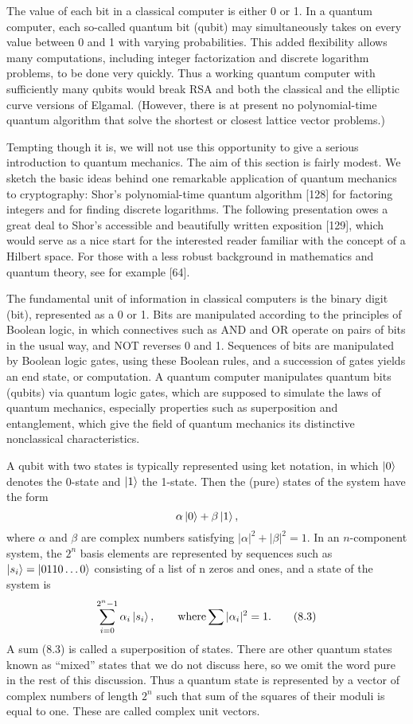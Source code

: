 \documentclass{article}
\begin{document}
The value of each bit in a classical computer is either 0 or 1. In a quantum computer, each so-called quantum bit (qubit) may simultaneously takes on every value between 0 and 1 with varying probabilities. This added flexibility  allows many computations, including integer factorization and discrete logarithm problems, to be done very quickly. Thus a working quantum computer with sufficiently many qubits would break RSA and both the classical and the elliptic curve versions of Elgamal. (However, there is at present no polynomial-time quantum algorithm that solve the shortest or closest lattice vector problems.)

Tempting though it is, we will not use this opportunity to give a serious introduction to quantum mechanics. The aim of this section is fairly modest. We sketch the basic ideas behind one remarkable application of quantum mechanics to cryptography: Shor's polynomial-time quantum algorithm [128] for factoring integers and for finding discrete logarithms. The following presentation owes a great deal to Shor's accessible and beautifully written exposition [129], which would serve as a nice start for the interested reader familiar with the concept of a Hilbert space. For those with a less robust background in mathematics and quantum theory, see for example [64].

The fundamental unit of information in classical computers is the binary digit (bit), represented as a 0 or 1. Bits are manipulated according to the principles of Boolean logic, in which connectives such as AND and OR operate on pairs of bits in the usual way, and NOT reverses 0 and 1. Sequences of bits are manipulated by Boolean logic gates, using these Boolean rules, and a succession of gates yields an end state, or computation. A quantum computer manipulates quantum bits (qubits) via quantum logic gates, which are supposed to simulate the laws of quantum mechanics, especially properties such as superposition and entanglement, which give the field of quantum mechanics its distinctive nonclassical characteristics.

A qubit with two states is typically represented using ket notation, in which \(\ket{0}\) denotes the 0-state and \(\ket{1}\) the 1-state. Then the (pure) states of the system have the form
\[
    \alpha \ket{0} + \beta \ket{1},
\]
where \(\alpha\) and \(\beta\) are complex numbers satisfying \(|\alpha|^2 + |\beta|^2 = 1\). In an \(n\)-component system, the \(2^{n}\) basis elements are represented by sequences such as \(\ket{s_i} = \ket{0110 \dots 0}\) consisting of a list of n zeros and ones, and a state of the system is 
\[
	\sum_{i = 0}^{2^n - 1} \alpha_i \ket{s_i}, \qquad \text{where} \sum |\alpha_i|^2 = 1. \tag{8.3}
\]
A sum (8.3) is called a superposition of states. There are other quantum states known as “mixed” states that we do not discuss here, so we omit the word pure in the rest of this discussion. Thus a quantum state is represented by a vector of complex numbers of length \(2^n\) such that sum of the squares of their moduli is equal to one. These are called complex unit vectors.
\end{document}
